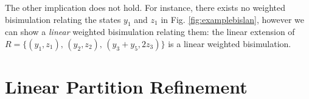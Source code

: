 \documentclass[3p]{elsarticle}
\newcommand{\cbox}[1]{\vspace{0.2cm}\noindent
  \fbox{\parbox{.97\textwidth}{#1}}\vspace{0.2cm}}
\newcommand{\lwa}{{\sc lwa}}           %
\newcommand{\mik}[1]{\marginpar{ \textbf{MiB:} {\footnotesize #1}}} %
\newtheorem{theorem}{Theorem}
\begin{document}
The other implication does not hold. For instance, there exists no weighted bisimulation
relating the states $y_1$ and $z_1$ in Fig. \ref{fig:examplebislan}, however we can show a
\emph{linear} weighted bisimulation relating them: the linear extension of $R=\{(y_1, z_1), \, (y_2,z_2), \, (y_3+y_5, 2z_3)\}$
is a linear weighted bisimulation.


%
%
%
%
%
%

\section{Linear Partition Refinement}\label{sec:linearpr}

%
%
\end{document}
